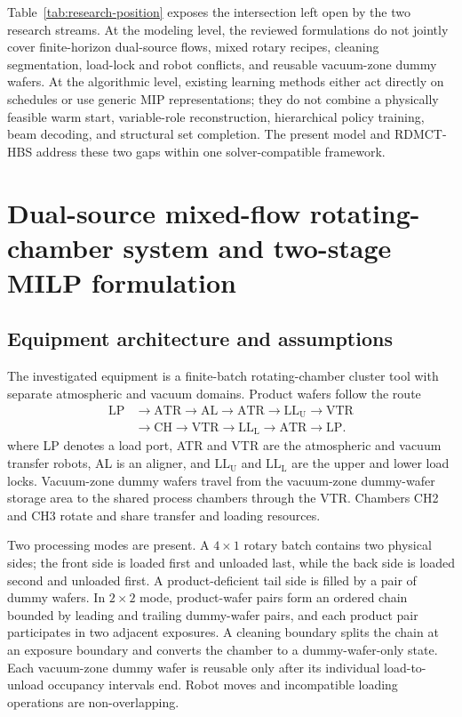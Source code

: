 \documentclass[preprint,12pt,authoryear]{elsarticle}
\newcommand{\method}{RDMCT-HBS}
\begin{document}
Table~\ref{tab:research-position} exposes the intersection left open by the
two research streams. At the modeling level, the reviewed formulations do not
jointly cover finite-horizon dual-source flows, mixed rotary recipes, cleaning
segmentation, load-lock and robot conflicts, and reusable vacuum-zone dummy wafers. At the
algorithmic level, existing learning methods either act directly on schedules
or use generic MIP representations; they do not combine a physically feasible
warm start, variable-role reconstruction, hierarchical policy training, beam
decoding, and structural set completion. The present model and \method{}
address these two gaps within one solver-compatible framework.

\section{Dual-source mixed-flow rotating-chamber system and two-stage MILP formulation}
\label{sec:model}

\subsection{Equipment architecture and assumptions}

The investigated equipment is a finite-batch rotating-chamber cluster tool with separate
atmospheric and vacuum domains. Product wafers follow the route
\[
\begin{aligned}
 \mathrm{LP}&\rightarrow\mathrm{ATR}\rightarrow\mathrm{AL}
 \rightarrow\mathrm{ATR}\rightarrow\mathrm{LL_U}\rightarrow\mathrm{VTR}\\
 &\rightarrow\mathrm{CH}\rightarrow\mathrm{VTR}\rightarrow\mathrm{LL_L}
 \rightarrow\mathrm{ATR}\rightarrow\mathrm{LP}.
\end{aligned}
\]
where LP denotes a load port, ATR and VTR are the atmospheric and vacuum
transfer robots, AL is an aligner, and $\mathrm{LL_U}$ and $\mathrm{LL_L}$ are
the upper and lower load locks. Vacuum-zone dummy wafers travel from the
vacuum-zone dummy-wafer storage area to
the shared process chambers through the VTR. Chambers CH2 and CH3 rotate and
share transfer and loading resources.

Two processing modes are present. A $4\times1$ rotary batch contains two
physical sides; the front side is loaded first and unloaded last, while the
back side is loaded second and unloaded first. A product-deficient tail side
is filled by a pair of dummy wafers. In $2\times2$ mode, product-wafer pairs form an
ordered chain bounded by leading and trailing dummy-wafer pairs, and each product pair
participates in two adjacent exposures. A cleaning boundary splits the chain
at an exposure boundary and converts the chamber to a dummy-wafer-only state.
Each vacuum-zone dummy wafer is reusable only after its individual load-to-unload occupancy
intervals end. Robot moves and incompatible loading operations are
non-overlapping.
\end{document}
